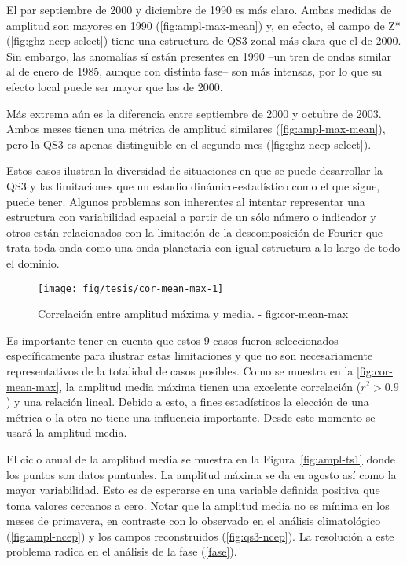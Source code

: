 \documentclass[spanish,a4paper,12p]{book}
\begin{document}
El par septiembre de 2000 y diciembre de 1990 es más claro. Ambas
medidas de amplitud son mayores en 1990 (\autoref{fig:ampl-max-mean}) y,
en efecto, el campo de Z* (\autoref{fig:ghz-ncep-select}) tiene una
estructura de QS3 zonal más clara que el de 2000. Sin embargo, las
anomalías sí están presentes en 1990 --un tren de ondas similar al de
enero de 1985, aunque con distinta fase-- son más intensas, por lo que
su efecto local puede ser mayor que las de 2000.

Más extrema aún es la diferencia entre septiembre de 2000 y octubre de
2003. Ambos meses tienen una métrica de amplitud similares
(\autoref{fig:ampl-max-mean}), pero la QS3 es apenas distinguible en el
segundo mes (\autoref{fig:ghz-ncep-select}).

Estos casos ilustran la diversidad de situaciones en que se puede
desarrollar la QS3 y las limitaciones que un estudio
dinámico-estadístico como el que sigue, puede tener. Algunos problemas
son inherentes al intentar representar una estructura con variabilidad
espacial a partir de un sólo número o indicador y otros están
relacionados con la limitación de la descomposición de Fourier que trata
toda onda como una onda planetaria con igual estructura a lo largo de
todo el dominio.

\begin{figure*}
\texttt{[image: fig/tesis/cor-mean-max-1]} \caption{Correlación entre amplitud máxima y media. - fig:cor-mean-max}\label{fig:cor-mean-max}
\end{figure*}

Es importante tener en cuenta que estos 9 casos fueron seleccionados
específicamente para ilustrar estas limitaciones y que no son
necesariamente representativos de la totalidad de casos posibles. Como
se muestra en la \autoref{fig:cor-mean-max}, la amplitud media máxima
tienen una excelente correlación (\(r^2>0.9\)) y una relación lineal.
Debido a esto, a fines estadísticos la elección de una métrica o la otra
no tiene una influencia importante. Desde este momento se usará la
amplitud media.

El ciclo anual de la amplitud media se muestra en la
Figura~\ref{fig:ampl-ts1} donde los puntos son datos puntuales. La
amplitud máxima se da en agosto así como la mayor variabilidad. Esto es
de esperarse en una variable definida positiva que toma valores cercanos
a cero. Notar que la amplitud media no es mínima en los meses de
primavera, en contraste con lo observado en el análisis climatológico
(\autoref{fig:ampl-ncep}) y los campos reconstruidos
(\autoref{fig:qs3-ncep}). La resolución a este problema radica en el
análisis de la fase (\autoref{fase}).
\end{document}
